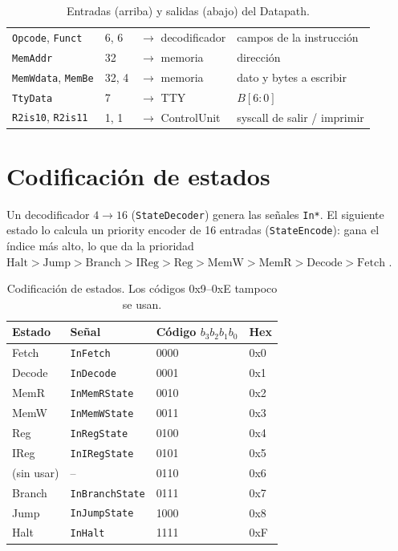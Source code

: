 \documentclass[11pt,a4paper]{article}
\newcommand{\sig}[1]{\texttt{#1}}
\begin{document}
\begin{table}[H]
\begin{tabular}{p{1.9cm}p{0.7cm}p{5.4cm}p{6.6cm}}
\sig{Opcode}, \sig{Funct} & 6, 6 & $\to$ decodificador & campos de la instrucci\'on\\
\sig{MemAddr} & 32 & $\to$ memoria & direcci\'on\\
\sig{MemWdata}, \sig{MemBe} & 32, 4 & $\to$ memoria & dato y bytes a escribir\\
\sig{TtyData} & 7 & $\to$ TTY & $B[6{:}0]$\\
\sig{R2is10}, \sig{R2is11} & 1, 1 & $\to$ ControlUnit & syscall de salir / imprimir\\
\bottomrule
\end{tabular}
\caption{Entradas (arriba) y salidas (abajo) del Datapath.}
\label{tab:puertos}
\end{table}
\section{Codificaci\'on de estados}
Un decodificador $4\to16$ (\texttt{StateDecoder}) genera las se\~nales \sig{In*}. El siguiente estado lo calcula un priority encoder de 16 entradas (\texttt{StateEncode}): gana el \'indice m\'as alto, lo que da la prioridad $\text{Halt}>\text{Jump}>\text{Branch}>\text{IReg}>\text{Reg}>\text{MemW}>\text{MemR}>\text{Decode}>\text{Fetch}$ \cite{logisim-pe}.

\begin{table}[H]
\centering
\begin{tabular}{llll}
\toprule
Estado & Se\~nal & C\'odigo $b_3b_2b_1b_0$ & Hex\\
\midrule
Fetch  & \sig{InFetch}       & 0000 & 0x0\\
Decode & \sig{InDecode}      & 0001 & 0x1\\
MemR   & \sig{InMemRState}   & 0010 & 0x2\\
MemW   & \sig{InMemWState}   & 0011 & 0x3\\
Reg    & \sig{InRegState}    & 0100 & 0x4\\
IReg   & \sig{InIRegState}   & 0101 & 0x5\\
(sin usar) & --              & 0110 & 0x6\\
Branch & \sig{InBranchState} & 0111 & 0x7\\
Jump   & \sig{InJumpState}   & 1000 & 0x8\\
Halt   & \sig{InHalt}        & 1111 & 0xF\\
\bottomrule
\end{tabular}
\caption{Codificaci\'on de estados. Los c\'odigos 0x9--0xE tampoco se usan.}
\end{table}
\end{document}
